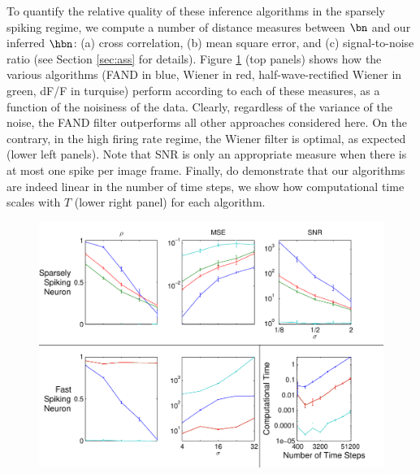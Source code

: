 To quantify the relative quality of these inference algorithms in the sparsely spiking regime, we compute a number of distance measures between $\bn$ and our inferred $\hbn$: (a) cross correlation, (b) mean square error, and (c) signal-to-noise ratio (see Section \ref{sec:ass} for details). Figure \ref{fig:stats} (top panels) shows how the various algorithms (FAND in blue, Wiener in red, half-wave-rectified Wiener in green, dF/F in turquise) perform according to each of these measures, as a function of the noisiness of the data. Clearly, regardless of the variance of the noise, the FAND filter outperforms all other approaches considered here.   On the contrary, in the high firing rate regime, the Wiener filter is optimal, as expected (lower left panels).  Note that SNR is only an appropriate measure when there is at most one spike per image frame.  Finally, do demonstrate that our algorithms are indeed linear in the number of time steps, we show how computational time scales with $T$ (lower right panel) for each algorithm.


\begin{figure}[H]
\centering \includegraphics[width=.9\linewidth]{../figs/stats}
\caption{} \label{fig:stats}
\end{figure}


